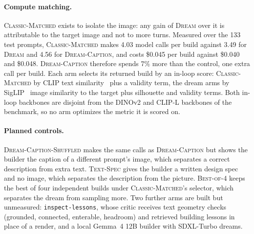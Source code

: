 \paragraph{Compute matching.}
\textsc{Classic-Matched} exists to isolate the image: any gain of \textsc{Dream} over it is attributable to the target image and not to more turns. %
Measured over the 133 test prompts, \textsc{Classic-Matched} makes 4.03 model calls per build against 3.49 for \textsc{Dream} and 4.56 for \textsc{Dream-Caption}, and costs \$0.045 per build against \$0.040 and \$0.048. %
\textsc{Dream-Caption} therefore spends 7\% more than the control, one extra call per build. %
Each arm selects its returned build by an in-loop score: \textsc{Classic-Matched} by CLIP text similarity~\citep{radford2021clip} plus a validity term, the dream arms by SigLIP~\citep{zhai2023siglip} image similarity to the target plus silhouette and validity terms. %
Both in-loop backbones are disjoint from the DINOv2 and CLIP-L backbones of the benchmark, so no arm optimizes the metric it is scored on. %

\paragraph{Planned controls.}
\textsc{Dream-Caption-Shuffled} makes the same calls as \textsc{Dream-Caption} but shows the builder the caption of a different prompt's image, which separates a correct description from extra text. %
\textsc{Text-Spec} gives the builder a written design spec and no image, which separates the description from the picture. 
\textsc{Best-of-4} keeps the best of four independent builds under \textsc{Classic-Matched}'s selector, which separates the dream from sampling more. %
Two further arms are built but unmeasured: \texttt{inspect-lessons}, whose critic receives text geometry checks (grounded, connected, enterable, headroom) and retrieved building lessons in place of a render, and a local Gemma~4 12B builder with SDXL-Turbo dreams. %


